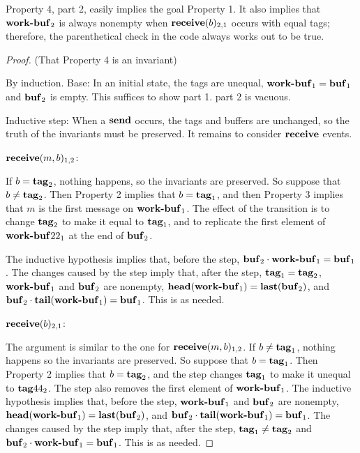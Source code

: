 Property 4, part 2, easily implies the goal Property 1.
It also implies that $\text{\textbf{work-buf}}_2$ is always nonempty when 
$\text{\textbf{receive}}(b)_{2,1}$ occurs with equal tags; therefore, the
parenthetical check in the code always works out to be true.

\begin{proof}
(That Property 4 is an invariant)

By induction. 
Base: In an initial state, the tags are unequal, 
$\text{\textbf{work-buf}}_1 = \text{\textbf{buf}}_1$ and $\text{\textbf{buf}}_2$ is empty.  This
suffices to show part 1.  part 2 is vacuous.

Inductive step:
When a $\text{\textbf{send}}$ occurs, the tags and buffers are unchanged, so the
truth of the invariants must be preserved. 
It remains to consider $\text{\textbf{receive}}$ events.

$\text{\textbf{receive}}(m,b)_{1,2}$:

If $b = \text{\textbf{tag}}_2$, nothing happens, so the invariants are
preserved.  So suppose that $b \neq \text{\textbf{tag}}_2$.  Then
Property 2 implies that $b = \text{\textbf{tag}}_1$, and then Property
3 implies that $m$ is the first message on
$\text{\textbf{work-buf}}_1$.  The effect of the transition is to
change $\text{\textbf{tag}}_2$ to make it equal to
$\text{\textbf{tag}}_1$, and to replicate the first element of
$\text{\textbf{work-buf}}22_1$ at the end of $\text{\textbf{buf}}_2$.

The inductive hypothesis implies that, before the step,
$\text{\textbf{buf}}_2 \cdot \text{\textbf{work-buf}}_1 =
\text{\textbf{buf}}_1$.  The changes caused by the step imply that,
after the step, $\text{\textbf{tag}}_1 = \text{\textbf{tag}}_2$,
$\text{\textbf{work-buf}}_1$ and $\text{\textbf{buf}}_2$ are nonempty,
$\text{\textbf{head}}(\text{\textbf{work-buf}}_1) =
\text{\textbf{last}}(\text{\textbf{buf}}_2)$, and
$\text{\textbf{buf}}_2 \cdot
\text{\textbf{tail}}(\text{\textbf{work-buf}}_1) =
\text{\textbf{buf}}_1$.  This is as needed.

$\text{\textbf{receive}}(b)_{2,1}$:

The argument is similar to the one for
$\text{\textbf{receive}}(m,b)_{1,2}$.  If $b \neq
\text{\textbf{tag}}_1$, nothing happens so the invariants are
preserved.  So suppose that $b = \text{\textbf{tag}}_1$.  Then
Property 2 implies that $b = \text{\textbf{tag}}_2$, and the step
changes $\text{\textbf{tag}}_1$ to make it unequal to
$\text{\textbf{tag}}44_2$.  The step also removes the first element of
$\text{\textbf{work-buf}}_1$.  The inductive hypothesis implies that,
before the step, $\text{\textbf{work-buf}}_1$ and
$\text{\textbf{buf}}_2$ are nonempty,
$\text{\textbf{head}}(\text{\textbf{work-buf}}_1) =
\text{\textbf{last}}(\text{\textbf{buf}}_2)$, and
$\text{\textbf{buf}}_2 \cdot
\text{\textbf{tail}}(\text{\textbf{work-buf}}_1) =
\text{\textbf{buf}}_1$.  The changes caused by the step imply that,
after the step, $\text{\textbf{tag}}_1 \neq \text{\textbf{tag}}_2$ and
$\text{\textbf{buf}}_2 \cdot \text{\textbf{work-buf}}_1 =
\text{\textbf{buf}}_1$.  This is as needed.
\end{proof}

